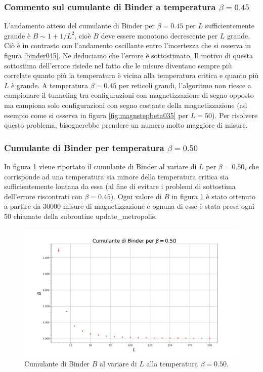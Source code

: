 \documentclass[10pt,a4paper]{article}
\begin{document}
	\subsubsection{Commento sul cumulante di Binder a temperatura $\beta=0.45$}
	L'andamento atteso del cumulante di Binder per $\beta=0.45$ per $L$ sufficientemente grande è $B\sim1+1/L^2$, cioè $B$ deve essere monotono decrescente per $L$ grande. Ciò è in contrasto con l'andamento oscillante entro l'incertezza che si osserva in figura \ref{binder045}. Ne deduciamo che l'errore è sottostimato. Il motivo di questa sottostima dell'errore risiede nel fatto che le misure diventano sempre più correlate quanto più la temperatura è vicina alla temperatura critica e quanto più $L$ è grande. A temperatura $\beta=0.45$ per reticoli grandi, l'algoritmo non riesce a campionare il tunneling tra configurazioni con magnetizzazione di segno opposto ma campiona solo configurazioni con segno costante della magnetizzazione (ad esempio come si osserva in figura \ref{fig:magnstepbeta035} per $L=50$). Per risolvere questo problema, bisognerebbe prendere un numero molto maggiore di misure. 

	
	
\subsubsection{Cumulante di Binder per temperatura $\beta=0.50$}
In figura \ref{binder050} viene riportato il cumulante di Binder al variare di $L$ per $\beta=0.50$, che corrisponde ad una temperatura sia minore della temperatura critica sia sufficientemente lontana da essa (al fine di evitare i problemi di sottostima dell'errore riscontrati con $\beta=0.45$). Ogni valore di $B$ in figura \ref{binder050} è stato ottenuto a partire da $30000$ misure di magnetizzazione e ognuna di esse è stata presa ogni 50 chiamate della subroutine update\_metropolis.
	\begin{figure}[h!]%
	\centering
	\includegraphics[width=1\linewidth]{binder050}
	\caption{Cumulante di Binder $B$ al variare di $L$ alla temperatura $\beta=0.50$.}
	\label{binder050}
\end{figure}
\end{document}

